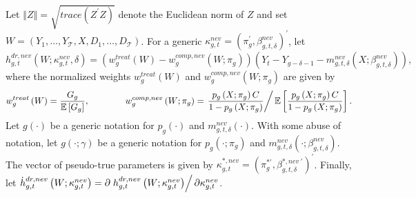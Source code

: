 \documentclass[11pt]{article}%
\theoremstyle{plain}
\numberwithin{sassumption}{section}
\numberwithin{equation}{section}
\begin{document}
Let $\left\Vert Z\right\Vert =\sqrt{trace\left(  Z^{\prime}Z\right)  }$ denote
the Euclidean norm of $Z$ and set $W=\left(  Y_{1},\dots,Y_{\mathcal{T}%
},X,D_{1},\dots,D_{\mathcal{T}}\right)  $. For a generic $\kappa_{g,t}^{nev}=\left(
\pi_{g}^{\prime},\beta_{g,t,\delta}^{nev}\right)  ^{\prime}$, let%
\[
h_{g,t}^{dr,nev}\left(  W;\kappa_{g,t}^{nev},\delta\right)  =\left(
w_{g}^{treat}\left(  W\right)  -w_{g}^{comp,nev}\left(  W;\pi_{g}\right)
\right)  \left(  Y_{t}-Y_{g-\delta-1}-m_{g,t,\delta}^{nev}\left(
X;\beta_{g,t,\delta}^{nev}\right)  \right)  ,
\]
where the normalized weights $w_{g}^{treat}\left(  W\right)  $ and
$w_{g}^{comp,nev}\left(  W;\pi_{g}\right)  $ are given by%
\begin{equation}
w_{g}^{treat}\left(  W\right)  =\frac{G_{g}}{\mathbb{E}\left[  G_{g}\right]
},~~~~~~~~~~~~w_{g}^{comp,nev}\left(  W;\pi_{g}\right)  =\left.  \dfrac
{p_{g}\left(  X;\pi_{g}\right)  C}{1-p_{g}\left(  X;\pi_{g}\right)  }\right/
\mathbb{E}\left[  \dfrac{p_{g}\left(  X;\pi_{g}\right)  C}{1-p_{g}\left(
X;\pi_{g}\right)  }\right]  . \label{eqn:weights}%
\end{equation}
Let $g\left(  \cdot\right)  $ be a generic notation for $p_{g}\left(
\cdot\right)  $ and $m_{g,t,\delta}^{nev}\left(  \cdot\right)  $. With some
abuse of notation, let $g\left(  \cdot;\gamma\right)  $ be a generic notation
for $p_{g}\left(  \cdot;\pi_{g}\right)  $ and $m_{g,t,\delta}^{nev}\left(
\cdot;\beta_{g,t,\delta}^{nev}\right)  $. The vector of pseudo-true parameters
is given by $\kappa_{g,t}^{\ast,nev}=\left(  \pi_{g}^{\ast\prime}%
,\beta_{g,t,\delta}^{\ast,nev~\prime}\right)  ^{\prime}$. Finally, let
$\dot{h}_{g,t}^{dr,nev}\left(  W;\kappa_{g,t}^{nev}\right)  =\partial\left.
h_{g,t}^{dr,nev}\left(  W;\kappa_{g,t}^{nev}\right)  \right/  \partial
\kappa_{g,t}^{nev}$.
\end{document}
